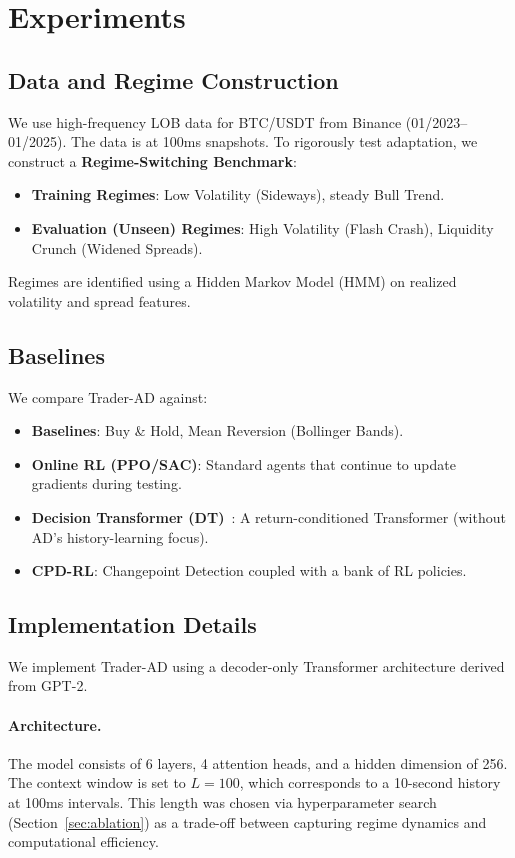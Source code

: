 \documentclass{article}
\begin{document}
\section{Experiments}
\label{sec:experiments}

\subsection{Data and Regime Construction}
We use high-frequency LOB data for BTC/USDT from Binance (01/2023--01/2025). The data is at 100ms snapshots.
To rigorously test adaptation, we construct a \textbf{Regime-Switching Benchmark}:
\begin{itemize}
    \item \textbf{Training Regimes}: Low Volatility (Sideways), steady Bull Trend.
    \item \textbf{Evaluation (Unseen) Regimes}: High Volatility (Flash Crash), Liquidity Crunch (Widened Spreads).
\end{itemize}
Regimes are identified using a Hidden Markov Model (HMM) on realized volatility and spread features.

\subsection{Baselines}
We compare Trader-AD against:
\begin{itemize}
    \item \textbf{Baselines}: Buy & Hold, Mean Reversion (Bollinger Bands).
    \item \textbf{Online RL (PPO/SAC)}: Standard agents that continue to update gradients during testing.
    \item \textbf{Decision Transformer (DT)}~\citep{chen2021decision}: A return-conditioned Transformer (without AD's history-learning focus).
    \item \textbf{CPD-RL}: Changepoint Detection coupled with a bank of RL policies.
\end{itemize}

\subsection{Implementation Details}
We implement Trader-AD using a decoder-only Transformer architecture derived from GPT-2.
\paragraph{Architecture.} The model consists of 6 layers, 4 attention heads, and a hidden dimension of 256. The context window is set to $L=100$, which corresponds to a 10-second history at 100ms intervals. This length was chosen via hyperparameter search (Section~\ref{sec:ablation}) as a trade-off between capturing regime dynamics and computational efficiency.
\end{document}
